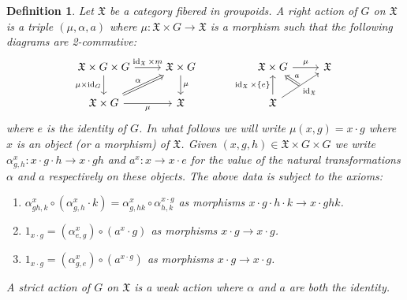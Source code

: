 \documentclass[10pt,a4paper]{amsart}
\newtheorem{definition}{Definition}
\newcommand{\fX}{{\mathfrak X}}
\DeclareMathOperator{\id}{id}
\begin{document}
\begin{definition}\label{d:weakAction}    
    Let $\fX$ be a category fibered in groupoids. 
    A right action of $G$ on $\fX$ is a triple 
    $(\mu, \alpha, a)$ where $\mu: \fX\times G\to \fX$ is a morphism such that 
    the following diagrams are 2-commutive:
    $$
    \begin{tikzcd}
        {\fX\times G \times G} & {\fX\times G} && {\fX\times G} & \fX \\
        {\fX\times G} & \fX && \fX
        \arrow["{\id_\fX\times m}", from=1-1, to=1-2]
        \arrow["{\mu\times \id_G}"', from=1-1, to=2-1]
        \arrow["\mu", from=1-2, to=2-2]
        \arrow["\mu", from=1-4, to=1-5]
        \arrow["\alpha", Rightarrow, from=2-1, to=1-2]
        \arrow["\mu"', from=2-1, to=2-2]
        \arrow["{\id_\fX\times \{e\}}", from=2-4, to=1-4]
        \arrow[""{name=0, anchor=center, inner sep=0}, "{\id_\fX}"', from=2-4, to=1-5]
        \arrow["a"', Rightarrow, from=0, to=1-4]
    \end{tikzcd}
    $$
    where $e$ is the identity of $G$. 
    In what follows we will write $\mu(x,g)=x\cdot g$ where $x$ is an object (or a morphism) 
    of  $\fX$. Given $(x,g,h)\in \fX\times G\times G$ we write 
    $\alpha^{x}_{g,h}:x\cdot g \cdot h \to x \cdot gh$ and $a^x:x \to x\cdot e$
    for the value of the natural transformations $\alpha$ and $a$ respectively on 
    these objects. The above data is subject to the axioms:
    \begin{enumerate}
        \item $\alpha_{gh,k}^{x}\circ (\alpha_{g,h}^{x}\cdot k) = \alpha_{g,hk}^{x} \circ \alpha_{h,k}^{x\cdot g}$ as morphisms $x\cdot g \cdot h \cdot k \to x\cdot ghk$.
        \item $1_{x\cdot g}=(\alpha^{x}_{e,g})\circ (a^{x}\cdot g)$ as morphisms $x\cdot g \to x \cdot g$.
        \item $1_{x\cdot g}=(\alpha^{x}_{g,e})\circ (a^{x\cdot g})$ as morphisms $x\cdot g \to x \cdot g$. 
    \end{enumerate}
    A \emph{strict action of $G$} on $\fX$ is a weak action where $\alpha$ and $a$ are both the identity. 
\end{definition}
\end{document}
